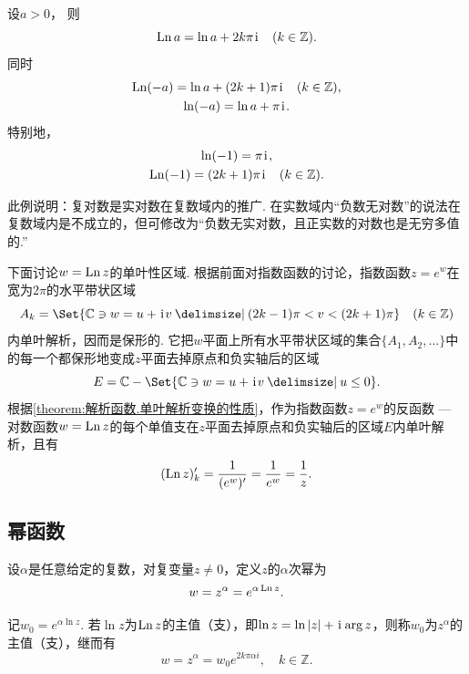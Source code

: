 \begin{example}
设\(a > 0\)，
则\begin{equation*}
	\operatorname{Ln} a = \ln a + 2k\pi\kern1pt\mathrm{i}\kern1pt \quad(k\in\mathbb{Z}).
\end{equation*}
同时\begin{gather*}
	\operatorname{Ln}(-a) = \ln a + (2k+1)\pi\kern1pt\mathrm{i}\kern1pt \quad(k\in\mathbb{Z}), \\
	\ln(-a) = \ln a + \pi\kern1pt\mathrm{i}\kern1pt.
\end{gather*}
特别地，\begin{gather*}
	\ln(-1) = \pi\kern1pt\mathrm{i}\kern1pt, \\
	\operatorname{Ln}(-1) = (2k+1)\pi\kern1pt\mathrm{i}\kern1pt \quad(k\in\mathbb{Z}).
\end{gather*}
\end{example}
此例说明：复对数是实对数在复数域内的推广.
在实数域内“负数无对数”的说法在复数域内是不成立的，但可修改为“负数无实对数，且正实数的对数也是无穷多值的.”

下面讨论\(w = \operatorname{Ln} z\)的单叶性区域.
根据前面对指数函数的讨论，指数函数\(z = e^w\)在宽为\(2\pi\)的水平带状区域\begin{equation*}
A_k = \Set{ \mathbb{C} \ni w = u + \iu v \given (2k-1)\pi < v < (2k+1)\pi }
\quad(k\in\mathbb{Z})
\end{equation*}内单叶解析，因而是保形的.
它把\(w\)平面上所有水平带状区域的集合\(\{A_1,A_2,\dotsc\}\)中的每一个都保形地变成\(z\)平面去掉原点和负实轴后的区域\begin{equation*}
E = \mathbb{C} - \Set{ \mathbb{C} \ni w = u + \iu v \given u \leq 0 }.
\end{equation*}
根据\cref{theorem:解析函数.单叶解析变换的性质}，作为指数函数\(z = e^w\)的反函数 --- 对数函数\(w = \operatorname{Ln} z\)的每个单值支在\(z\)平面去掉原点和负实轴后的区域\(E\)内单叶解析，且有\begin{equation}
(\operatorname{Ln} z)'_k = \frac{1}{(e^w)'} = \frac{1}{e^w} = \frac{1}{z}.
\end{equation}

\subsection{幂函数}
\begin{definition}
设\(\alpha\)是任意给定的复数，对复变量\(z \neq 0\)，定义\(z\)的\(\alpha\)次幂为\begin{equation*}
w = z^\alpha = e^{\alpha \operatorname{Ln} z}.
\end{equation*}

记\(w_0 = e^{\alpha \ln z}\).
若\(\ln z\)为\(\operatorname{Ln} z\)的主值（支），即\(\ln z = \ln\abs{z} + \kern1pt\mathrm{i}\kern1pt \arg z\)，则称\(w_0\)为\(z^\alpha\)的主值（支），继而有\begin{equation*}
w = z^\alpha = w_0 e^{2k\pi\alpha i}, \quad k\in\mathbb{Z}.
\end{equation*}
\end{definition}

